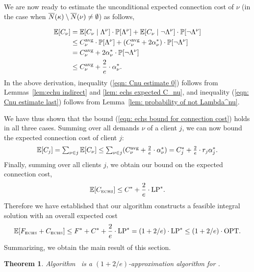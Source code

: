 \documentclass[oneside,final]{ucr}
\newtheorem{theorem}{Theorem}
\def\dsp{\def\baselinestretch{2.0}\large\normalsize}
\def\ssp{\def\baselinestretch{1.0}\large\normalsize}
\begin{document}
We are now ready to estimate the unconditional expected connection cost of $\nu$
(in the case when ${\overline{N}}(\kappa)\setminus {\overline{N}}(\nu)\neq\emptyset$)
as follows,

\ssp
\begin{align}
  \notag
  \mathbb{E}[C_\nu] &= \mathbb{E}[C_{\nu} \mid \Lambda^\nu] \cdot \mathbb{P}[\Lambda^\nu] 
	+ \mathbb{E}[C_{\nu} \mid \neg \Lambda^\nu] \cdot	\mathbb{P}[\neg \Lambda^\nu]
  \\
  &\leq C^{{\mbox{\scriptsize\rm avg}}}_{\nu} \cdot \mathbb{P}[\Lambda^\nu] 
		+ (C^{{\mbox{\scriptsize\rm avg}}}_{\nu} + 2\alpha_{\nu}^\ast)  \cdot \mathbb{P}[\neg \Lambda^\nu]
  \label{eqn: Cnu estimate 0}
  \\
  &= C^{{\mbox{\scriptsize\rm avg}}}_{\nu} 
	+  2\alpha_{\nu}^\ast \cdot \mathbb{P}[\neg \Lambda^\nu]
		\notag
	\\
	&\le C^{{\mbox{\scriptsize\rm avg}}}_{\nu} + \frac{2}{e}\cdot\alpha_{\nu}^\ast.
	  \label{eqn: Cnu estimate last}
\end{align}
\dsp
In the above derivation, inequality (\ref{eqn: Cnu estimate 0})
follows from Lemmas~\ref{lem:echu indirect} and \ref{lem: echs expected C_nu}, 
and inequality (\ref{eqn: Cnu estimate last}) follows from
Lemma~\ref{lem: probability of not Lambda^nu}.

\medskip

We have thus shown that the bound (\ref{eqn: echs bound for connection cost})
holds in all three cases.
Summing over all demands $\nu$ of a client $j$, we can now bound
the expected connection cost of client $j$:
%
\begin{equation*}
  \mathbb{E}[C_j] = \textstyle\sum_{\nu\in j} \mathbb{E}[C_\nu] 
\leq {\textstyle\sum_{\nu\in j} (C^{{\mbox{\scriptsize\rm avg}}}_{\nu} + \frac{2}{e}\cdot\alpha_{\nu}^\ast) }
  = { C_j^\ast + \frac{2}{e}\cdot r_j\alpha_j^\ast}.
\end{equation*}
%
Finally, summing over all clients $j$, we obtain our bound on
the expected connection cost,
%
\begin{equation*}
 \mathbb{E}[ C_{\mbox{\tiny\rm ECHS}}] \le C^\ast + \frac{2}{e}\cdot\mbox{\rm LP}^\ast.
\end{equation*}
% 
Therefore we have established that
our algorithm constructs a feasible integral solution with
an overall expected cost 
%
\begin{equation*}
  \label{eq:chudakall}
	 \mathbb{E}[ F_{\mbox{\tiny\rm ECHS}} + C_{\mbox{\tiny\rm ECHS}}]
	\le
  	F^\ast + C^\ast + \frac{2}{e}\cdot \mbox{\rm LP}^\ast = (1+2/e)\cdot \mbox{\rm LP}^\ast
  \leq (1+2/e)\cdot \mbox{\rm OPT}.
\end{equation*}
%
Summarizing, we obtain the main result of this section.

\begin{theorem}\label{thm:1736}
  Algorithm~{\ECHS} is a $(1+2/e)$-approximation algorithm for \FTFP.
\end{theorem}
\end{document}
